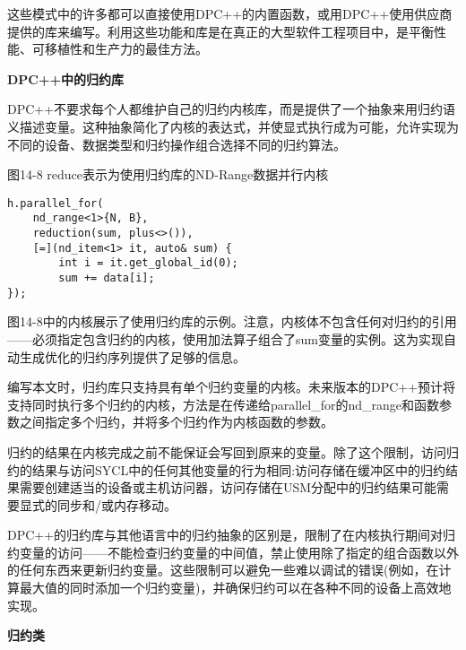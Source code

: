 这些模式中的许多都可以直接使用DPC++的内置函数，或用DPC++使用供应商提供的库来编写。利用这些功能和库是在真正的大型软件工程项目中，是平衡性能、可移植性和生产力的最佳方法。\par

\hspace*{\fill} \par %
\textbf{DPC++中的归约库}

DPC++不要求每个人都维护自己的归约内核库，而是提供了一个抽象来用归约语义描述变量。这种抽象简化了内核的表达式，并使显式执行成为可能，允许实现为不同的设备、数据类型和归约操作组合选择不同的归约算法。\par

\hspace*{\fill} \par %
图14-8 reduce表示为使用归约库的ND-Range数据并行内核
\begin{lstlisting}[caption={}]
h.parallel_for(
	nd_range<1>{N, B},
	reduction(sum, plus<>()),
	[=](nd_item<1> it, auto& sum) {
		int i = it.get_global_id(0);
		sum += data[i];
});
\end{lstlisting}

图14-8中的内核展示了使用归约库的示例。注意，内核体不包含任何对归约的引用——必须指定包含归约的内核，使用加法算子组合了sum变量的实例。这为实现自动生成优化的归约序列提供了足够的信息。\par

编写本文时，归约库只支持具有单个归约变量的内核。未来版本的DPC++预计将支持同时执行多个归约的内核，方法是在传递给parallel\_for的nd\_range和函数参数之间指定多个归约，并将多个归约作为内核函数的参数。\par

归约的结果在内核完成之前不能保证会写回到原来的变量。除了这个限制，访问归约的结果与访问SYCL中的任何其他变量的行为相同:访问存储在缓冲区中的归约结果需要创建适当的设备或主机访问器，访问存储在USM分配中的归约结果可能需要显式的同步和/或内存移动。\par

DPC++的归约库与其他语言中的归约抽象的区别是，限制了在内核执行期间对归约变量的访问——不能检查归约变量的中间值，禁止使用除了指定的组合函数以外的任何东西来更新归约变量。这些限制可以避免一些难以调试的错误(例如，在计算最大值的同时添加一个归约变量)，并确保归约可以在各种不同的设备上高效地实现。\par

\hspace*{\fill} \par %
\textbf{归约类}

